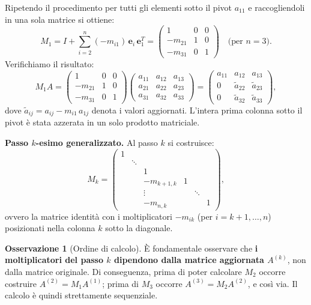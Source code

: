 \documentclass[a4paper,12pt]{article}
\theoremstyle{definition}
\newtheorem{osservazione}{Osservazione}[section]
\theoremstyle{remark}
\begin{document}
Ripetendo il procedimento per tutti gli elementi sotto il pivot $a_{11}$ e raccogliendoli in una
sola matrice si ottiene:
\[
  M_1 = I + \sum_{i=2}^{n} (-m_{i1})\,\mathbf{e}_i\,\mathbf{e}_1^T
      = \begin{pmatrix} 1 & 0 & 0 \\ -m_{21} & 1 & 0 \\ -m_{31} & 0 & 1 \end{pmatrix}
        \quad\text{(per }n=3\text{)}.
\]
Verifichiamo il risultato:
\[
  M_1 A
  = \begin{pmatrix} 1 & 0 & 0 \\ -m_{21} & 1 & 0 \\ -m_{31} & 0 & 1 \end{pmatrix}
    \begin{pmatrix} a_{11} & a_{12} & a_{13} \\ a_{21} & a_{22} & a_{23} \\ a_{31} & a_{32} & a_{33} \end{pmatrix}
  = \begin{pmatrix} a_{11} & a_{12} & a_{13} \\ 0 & \tilde{a}_{22} & \tilde{a}_{23} \\ 0 & \tilde{a}_{32} & \tilde{a}_{33} \end{pmatrix},
\]
dove $\tilde{a}_{ij} = a_{ij} - m_{i1}\,a_{1j}$ denota i valori aggiornati.  L'intera prima
colonna sotto il pivot è stata azzerata in un solo prodotto matriciale.

\medskip
\noindent\textbf{Passo $k$-esimo generalizzato.}
Al passo $k$ si costruisce:
\[
  M_k = \begin{pmatrix}
    1           &        &   &            &        &   \\
                & \ddots &   &            &        &   \\
                &        & 1 &            &        &   \\
                &        & -m_{k+1,k} & 1 &      &   \\
                &        & \vdots     &   & \ddots &   \\
                &        & -m_{n,k}   &   &        & 1
  \end{pmatrix},
\]
ovvero la matrice identità con i moltiplicatori $-m_{ik}$ (per $i=k+1,\ldots,n$) posizionati nella
colonna $k$ sotto la diagonale.

\begin{osservazione}[Ordine di calcolo]
È fondamentale osservare che \textbf{i moltiplicatori del passo $k$ dipendono dalla matrice
aggiornata $A^{(k)}$}, non dalla matrice originale. Di conseguenza, prima di poter calcolare $M_2$
occorre costruire $A^{(2)} = M_1 A^{(1)}$; prima di $M_3$ occorre $A^{(3)} = M_2 A^{(2)}$, e così
via. Il calcolo è quindi strettamente sequenziale.
\end{osservazione}
\end{document}
